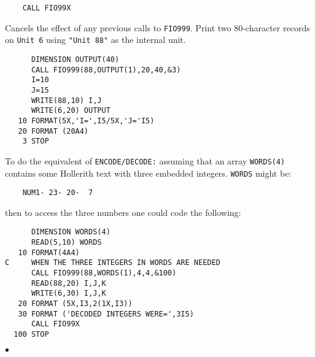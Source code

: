 \begin{verbatim}
    CALL FIO99X
\end{verbatim}
Cancels the effect of any previous calls to {\tt FIO999}.
\newpage
\Examples
Print two 80-character records on {\tt Unit 6} using {\tt "Unit 88"}
as the internal unit.
\begin{verbatim}
      DIMENSION OUTPUT(40)
      CALL FIO999(88,OUTPUT(1),20,40,&3)
      I=10
      J=15
      WRITE(88,10) I,J
      WRITE(6,20) OUTPUT
   10 FORMAT(5X,'I=',I5/5X,'J='I5)
   20 FORMAT (20A4)
    3 STOP
\end{verbatim}
To do the equivalent of {\tt ENCODE/DECODE:}
assuming that an array {\tt WORDS(4)} contains some Hollerith text
with three embedded integers. {\tt WORDS} might be:
\begin{verbatim}
    NUM1- 23- 20-  7
\end{verbatim}
then to access the three numbers one could code the following:
\begin{verbatim}
      DIMENSION WORDS(4)
      READ(5,10) WORDS
   10 FORMAT(4A4)
C     WHEN THE THREE INTEGERS IN WORDS ARE NEEDED
      CALL FIO999(88,WORDS(1),4,4,&100)
      READ(88,20) I,J,K
      WRITE(6,30) I,J,K
   20 FORMAT (5X,I3,2(1X,I3))
   30 FORMAT ('DECODED INTEGERS WERE=',3I5)
      CALL FIO99X
  100 STOP
\end{verbatim}
$\bullet$
